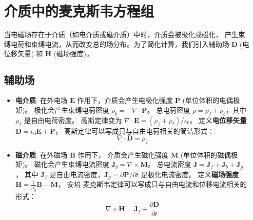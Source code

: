 \documentclass[fontset=none]{ctexart}
\begin{document}
\section{介质中的麦克斯韦方程组}
当电磁场存在于介质（如电介质或磁介质）中时，介质会被极化或磁化，
产生束缚电荷和束缚电流，从而改变总的场分布。为了简化计算，我们引入辅助场 $\bm{D}$ (电位移矢量) 
和 $\bm{H}$ (磁场强度)。
\subsection{辅助场}
\begin{itemize}
    \item \textbf{电介质}: 在外电场 $\bm{E}$ 作用下，介质会产生电极化强度 $\bm{P}$ (单位体积的电偶极矩)。
    极化会产生束缚电荷密度 $\rho_b = -\nabla \cdot \bm{P}$。
    总电荷密度 $\rho = \rho_f + \rho_b$，其中 $\rho_f$ 是自由电荷密度。
    高斯定律变为 $\nabla \cdot \bm{E} = (\rho_f + \rho_b)/\epsilon_0$。
    定义\textbf{电位移矢量} $\bm{D} = \epsilon_0 \bm{E} + \bm{P}$，
    高斯定律可以写成只与自由电荷相关的简洁形式：
    \begin{equation}
        \nabla \cdot \bm{D} = \rho_f
    \end{equation}
    \item \textbf{磁介质}: 在外磁场 $\bm{B}$ 作用下，
    介质会产生磁化强度 $\bm{M}$ (单位体积的磁偶极矩)。
    磁化会产生束缚电流密度 $\bm{J}_b = \nabla \times \bm{M}$。
    总电流密度 $\bm{J} = \bm{J}_f + \bm{J}_b + \bm{J}_p$，
    其中 $\bm{J}_f$ 是自由电流密度，$\bm{J}_p = \partial\bm{P}/\partial t$ 是极化电流密度。
    定义\textbf{磁场强度} $\bm{H} = \frac{1}{\mu_0}\bm{B} - \bm{M}$，
    安培-麦克斯韦定律可以写成只与自由电流和位移电流相关的形式：
    \begin{equation}
        \nabla \times \bm{H} = \bm{J}_f + \frac{\partial \bm{D}}{\partial t}
    \end{equation}
\end{itemize}
\end{document}
